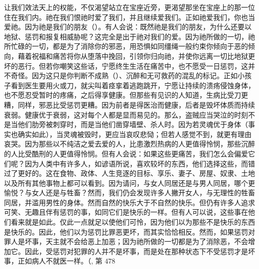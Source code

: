 让我们效法天上的权能，不仅渴望站立在宝座近旁，更渴望那坐在宝座上的那一位住在我们内。祂在我们恨祂时爱了我们，并且继续爱我们。\newline{}正如祂爱我们，你也当爱祂。因为祂是我们的朋友（）。有人会说：既然祂是我们的朋友，为什么还要以地狱、惩罚和报复相威胁呢？这完全是出于祂对我们的爱。因为祂所做的一切，祂所忙碌的一切，都是为了消除你的邪恶，用恐惧如同缰绳一般约束你倾向于恶的倾向，藉着祝福和痛苦将你从堕落中挽回，引领你归向祂，并使你远离一切比地狱更坏的恶行。但若你嘲笑这些话，宁愿终生生活在痛苦中，也不愿受一日惩罚，这并不奇怪。因为这只是你判断不成熟（）、沉醉和无可救药的混乱的标记。正如小孩子看到医生要用火或刀，就尖叫着痉挛着逃跑跳开，宁愿让持续的溃疡侵蚀身体，也不愿忍受暂时的疼痛，之后得享健康。但那些有见识的人知道，生病比受刀更糟，同样，邪恶比受惩罚更糟。因为前者是得医治而健康，后者是毁坏体质而持续衰弱。健康优于衰弱，这对每个人都是显而易见的。那么，盗贼应当哭泣的时刻不是当他们肋旁被刺穿时，而是当他们凿穿墙壁、杀人时。因为若灵魂优于身体（事实也确实如此），当灵魂被毁时，更应当哀叹悲恸；但若人感觉不到，就更有理由哀哭。因为那些以不纯洁之爱去爱的人，比患激烈热病的人更值得怜悯，那些沉醉的人比受酷刑的人更值得怜悯。但有人会说：如果这些更痛苦，我们怎么会偏爱它们呢？因为人类中有许多人，如谚语所说，喜欢较坏的东西，他们选择这些，而错过了更好的。这在食物、政体、人生竞逐的目标、享乐、妻子、房屋、奴隶、土地以及所有其他事物上都可以看到。因为请问，与女人同居还是与男人同居，哪个更愉悦？与女人还是与牲畜？然而，我们仍会发现许多人撇开女人，与无理性的牲畜同居，并滥用男性的身体。然而自然的快乐大于不自然的快乐。但仍有许多人追求可笑、无趣且伴有惩罚的事，如同它们是快乐的一样。但有人可以说，这些事在他们看来就是如此。仅此一点就足以使他们可怜，因为他们以为那些不是快乐的东西是快乐的。因此，他们以为惩罚比罪恶更坏，而其实恰恰相反。然而，如果惩罚对罪人是坏事，天主就不会给恶上加恶；因为祂所做的一切都是为了消除恶，不会增加它。因此，受惩罚对犯罪的人并不是坏事，而是处在那种状态下不受惩罚才是坏事，正如病人不就医一样。（,  第 478 
